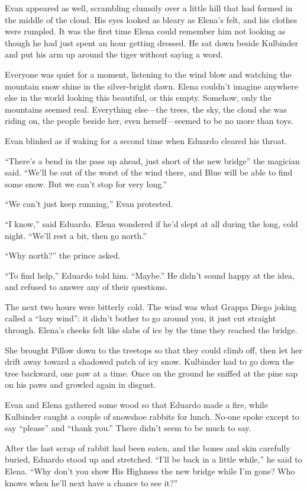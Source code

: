 \documentclass[10pt]{book}
\begin{document}
Evan appeared as well, scrambling clumsily over a little hill that had formed in the middle of the cloud. His eyes looked as bleary as Elena's felt, and his clothes were rumpled. It was the first time Elena could remember him not looking as though he had just spent an hour getting dressed. He sat down beside Kulbinder and put his arm up around the tiger without saying a word.

Everyone was quiet for a moment, listening to the wind blow and watching the mountain snow shine in the silver-bright dawn. Elena couldn't imagine anywhere else in the world looking this beautiful, or this empty. Somehow, only the mountains seemed real. Everything else---the trees, the sky, the cloud she was riding on, the people beside her, even herself---seemed to be no more than toys.

Evan blinked as if waking for a second time when Eduardo cleared his throat.

``There's a bend in the pass up ahead, just short of the new bridge'' the magician said. ``We'll be out of the worst of the wind there, and Blue will be able to find some snow. But we can't stop for very long.''

``We can't just keep running,'' Evan protested.

``I know,'' said Eduardo. Elena wondered if he'd slept at all during the long, cold night. ``We'll rest a bit, then go north.''

``Why north?'' the prince asked.

``To find help,'' Eduardo told him. ``Maybe.'' He didn't sound happy at the idea, and refused to answer any of their questions.

The next two hours were bitterly cold. The wind was what Grappa Diego joking called a ``lazy wind'': it didn't bother to go around you, it just cut straight through. Elena's cheeks felt like slabs of ice by the time they reached the bridge.

She brought Pillow down to the treetops so that they could climb off, then let her drift away toward a shadowed patch of icy snow. Kulbinder had to go down the tree backward, one paw at a time. Once on the ground he sniffed at the pine sap on his paws and growled again in disgust.

Evan and Elena gathered some wood so that Eduardo made a fire, while Kulbinder caught a couple of snowshoe rabbits for lunch. No-one spoke except to say ``please'' and ``thank you.'' There didn't seem to be much to say.

After the last scrap of rabbit had been eaten, and the bones and skin carefully buried, Eduardo stood up and stretched. ``I'll be back in a little while,'' he said to Elena. ``Why don't you show His Highness the new bridge while I'm gone? Who knows when he'll next have a chance to see it?''
\end{document}

